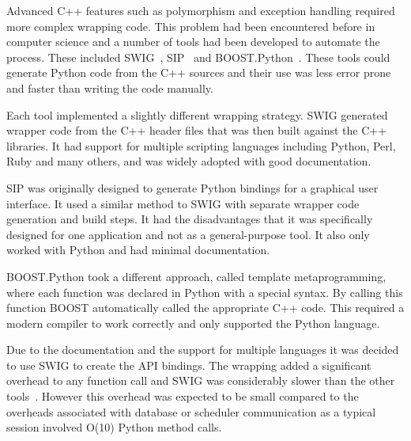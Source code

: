 Advanced C++ features such as polymorphism and exception handling required more complex wrapping code. This problem had been encountered before in computer science and a number of tools had been developed to automate the process. These included SWIG~\cite{citeulike:881608}, SIP~\cite{citeulike:881611} and BOOST.Python~\cite{citeulike:881616}. These tools could generate Python code from the C++ sources and their use was less error prone and faster than writing the code manually.

Each tool implemented a slightly different wrapping strategy. SWIG generated wrapper code from the C++ header files that was then built against the C++ libraries. It had support for multiple scripting languages including Python, Perl, Ruby and many others, and was widely adopted with good documentation. 

SIP was originally designed to generate Python bindings for a graphical user interface. It used a similar method to SWIG with separate wrapper code generation and build steps. It had the disadvantages that it was specifically designed for one application and not as a general-purpose tool. It also only worked with Python and had minimal documentation. 

BOOST.Python took a different approach, called template metaprogramming, where each function was declared in Python with a special syntax. By calling this function BOOST automatically called the appropriate C++ code. This required a modern compiler to work correctly and only supported the Python language.


Due to the documentation and the support for multiple languages it was decided to use SWIG to create the API bindings. The wrapping added a significant overhead to any function call and SWIG was considerably slower than the other tools~\cite{citeulike:881635}. However this overhead was expected to be small compared to the overheads associated with database or scheduler communication as a typical session involved O(10) Python method calls.


